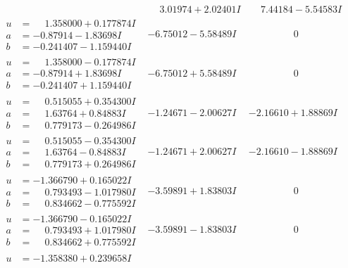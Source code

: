 \documentclass[1p]{elsarticle_modified}
\theoremstyle{definition}
\begin{document}
$$\begin{array}{c|c|c}
 & \phantom{-}3.01974 + 2.02401 I & \phantom{-}7.44184 - 5.54583 I \\ \hline\begin{aligned}
u &= \phantom{-}1.358000 + 0.177874 I \\
a &= -0.87914 - 1.83698 I \\
b &= -0.241407 - 1.159440 I\end{aligned}
 & -6.75012 - 5.58489 I & \phantom{-0.000000 } 0 \\ \hline\begin{aligned}
u &= \phantom{-}1.358000 - 0.177874 I \\
a &= -0.87914 + 1.83698 I \\
b &= -0.241407 + 1.159440 I\end{aligned}
 & -6.75012 + 5.58489 I & \phantom{-0.000000 } 0 \\ \hline\begin{aligned}
u &= \phantom{-}0.515055 + 0.354300 I \\
a &= \phantom{-}1.63764 + 0.84883 I \\
b &= \phantom{-}0.779173 - 0.264986 I\end{aligned}
 & -1.24671 - 2.00627 I & -2.16610 + 1.88869 I \\ \hline\begin{aligned}
u &= \phantom{-}0.515055 - 0.354300 I \\
a &= \phantom{-}1.63764 - 0.84883 I \\
b &= \phantom{-}0.779173 + 0.264986 I\end{aligned}
 & -1.24671 + 2.00627 I & -2.16610 - 1.88869 I \\ \hline\begin{aligned}
u &= -1.366790 + 0.165022 I \\
a &= \phantom{-}0.793493 - 1.017980 I \\
b &= \phantom{-}0.834662 - 0.775592 I\end{aligned}
 & -3.59891 + 1.83803 I & \phantom{-0.000000 } 0 \\ \hline\begin{aligned}
u &= -1.366790 - 0.165022 I \\
a &= \phantom{-}0.793493 + 1.017980 I \\
b &= \phantom{-}0.834662 + 0.775592 I\end{aligned}
 & -3.59891 - 1.83803 I & \phantom{-0.000000 } 0 \\ \hline\begin{aligned}
u &= -1.358380 + 0.239658 I \\

\end{aligned}
\end{array}$$
\end{document}
